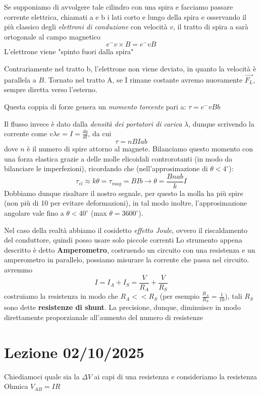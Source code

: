 \documentclass{article}
\begin{document}
Se supponiamo di avvolgere tale cilindro con una spira e facciamo passare corrente elettrica, chiamati a e b i lati corto e lungo della spira e 
osservando il più classico degli \textit{elettroni di conduzione} con velocità $v$, il tratto di spira a sarà ortogonale al campo magnetico 
\[
e^- v \times B = e^- v B 
\]
L'elettrone viene "spinto fuori dalla spira"

Contrariamente nel tratto b, l'elettrone non viene deviato, in quanto la velocità è parallela a $B$. Tornato nel tratto A, se I rimane costante avremo nuovamente $\vec{F_L}$, sempre diretta verso l'esterno.

Questa coppia di forze genera un \textit{momento torcente} pari a: $\tau = e^- v B b $

Il flusso invece è dato dalla \textit{densità dei portatori di carica} $\lambda$, dunque scrivendo la corrente come $ v \lambda e =I = \frac{dq}{dt}$, da cui
\[
\tau = n B I a b
\]
dove $n$ è il numero di spire attorno al magnete. 
Bilanciamo questo momento con una forza elastica grazie a delle molle elicoidali controrotanti (in modo da bilanciare le imperfezioni), ricordando che (nell'approsimazione di $\theta < 4^\circ$):
\[
\tau_{el} \approx k \theta = \tau_{mag} = B I b \rightarrow \theta = \frac{B n a b}{k} I
\]
Dobbiamo dunque risaltare il nostro segnale, per questo la molla ha più spire (non più di 10 per evitare deformazioni), in tal modo inoltre, l'approsimazione angolare vale fino a $\theta < 40^\circ$ (max $\theta = 3600^\circ$).

Nel caso della realtà abbiamo il cosidetto \textit{effetto Joule}, ovvero il riscaldamento del conduttore, quindi posso usare solo piccole correnti 
Lo strumento appena descritto è detto \textbf{Amperometro}, costruendo un circuito con una resistenza e un amperometro in parallelo, possiamo misurare la corrente che passa nel circuito.
avremmo
\[
I= I_A + I_S= \frac{V}{R_A}+ \frac{V}{R_S}
\]
costruiamo la resistenza in modo che $R_A << R_S$ (per esempio $\frac{R_A}{R_S}=\frac{1}{10}$), tali $R_S$ sono dette \textbf{resistenze di shunt}. La precisione, dunque, diminuisce in modo direttamente proporzianale all'aumento del numero di resistenze 

\section{Lezione 02/10/2025}
Chiediamoci quale sia la $\Delta V$ ai capi di una resistenza e consideriamo la resistenza Ohmica $V_{AB}= IR$
\end{document}
